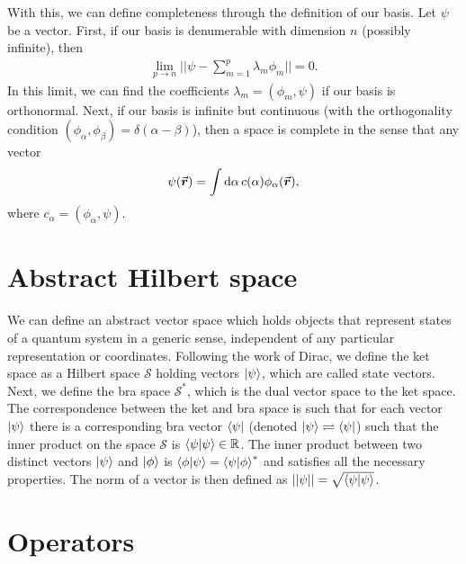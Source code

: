 With this, we can define completeness through the definition of our basis.
Let $\psi$ be a vector.
First, if our basis is denumerable with dimension $n$ (possibly infinite), then
\begin{eqnarray}
    \lim_{p \rightarrow n} \Big| \Big| \psi - \sum_{m=1}^{p} \lambda_{m} \phi_{m} \Big| \Big| = 0
.\end{eqnarray}
In this limit, we can find the coefficients $\lambda_{m} = (\phi_{m},\psi)$ if our basis is orthonormal.
Next, if our basis is infinite but continuous (with the orthogonality condition $(\phi_{\alpha},\phi_{\beta}) = \delta(\alpha - \beta)$), then a space is complete in the sense that any vector 
\begin{eqnarray}
    \psi(\va*{r}) = \int \dd{\alpha} c(\alpha) \phi_{\alpha}(\va*{r})
,\end{eqnarray}
where $c_{\alpha} = (\phi_{\alpha},\psi)$.


\section{Abstract Hilbert space}

We can define an abstract vector space which holds objects that represent states of a quantum system in a generic sense, independent of any particular representation or coordinates.
Following the work of Dirac, we define the ket space as a Hilbert space $\mathcal{S}$ holding vectors $\ket{\psi}$, which are called state vectors.
Next, we define the bra space $\mathcal{S}^{*}$, which is the dual vector space to the ket space.
The correspondence between the ket and bra space is such that for each vector $\ket{\psi}$ there is a corresponding bra vector $\bra{\psi}$ (denoted $\ket{\psi} \rightleftharpoons \bra{\psi}$) such that the inner product on the space $\mathcal{S}$ is $\bra{\psi}\ket{\psi} \in \mathbb{R}$.
The inner product between two distinct vectors $\ket{\psi}$ and $\ket{\phi}$ is $\bra{\phi}\ket{\psi} = \bra{\psi}\ket{\phi}^{*}$ and satisfies all the necessary properties.
The norm of a vector is then defined as $|| \psi || = \sqrt{\bra{\psi}\ket{\psi}}$.


\section{Operators}

